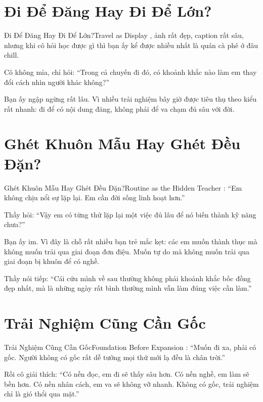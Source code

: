 \section{Đi Để Đăng Hay Đi Để Lớn?}
\begin{truyen}{Đi Để Đăng Hay Đi Để Lớn?}{Travel as Display}
, ảnh rất đẹp, caption rất sâu, nhưng khi cô hỏi học được gì thì bạn ấy kể được nhiều nhất là quán cà phê ở đâu chill.

Cô không mỉa, chỉ hỏi: ``Trong cả chuyến đi đó, có khoảnh khắc nào làm em thay đổi cách nhìn người khác không?''

Bạn ấy ngập ngừng rất lâu. Vì nhiều trải nghiệm bây giờ được tiêu thụ theo kiểu rất nhanh: đi để có nội dung đăng, không phải để va chạm đủ sâu với đời.

\end{truyen}

\section{Ghét Khuôn Mẫu Hay Ghét Đều Đặn?}
\begin{truyen}{Ghét Khuôn Mẫu Hay Ghét Đều Đặn?}{Routine as the Hidden Teacher}
: ``Em không chịu nổi sự lặp lại. Em cần đời sống linh hoạt hơn.''

Thầy hỏi: ``Vậy em có từng thử lặp lại một việc đủ lâu để nó biến thành kỹ năng chưa?''

Bạn ấy im. Vì đây là chỗ rất nhiều bạn trẻ mắc kẹt: các em muốn thành thục mà không muốn trải qua giai đoạn đơn điệu. Muốn tự do mà không muốn trải qua giai đoạn bị khuôn để có nghề.

Thầy nói tiếp: ``Cái cứu mình về sau thường không phải khoảnh khắc bốc đồng đẹp nhất, mà là những ngày rất bình thường mình vẫn làm đúng việc cần làm.''
\end{truyen}

\section{Trải Nghiệm Cũng Cần Gốc}
\begin{truyen}{Trải Nghiệm Cũng Cần Gốc}{Foundation Before Expansion}
: ``Muốn đi xa, phải có gốc. Người không có gốc rất dễ tưởng mọi thứ mới lạ đều là chân trời.''

Rồi cô giải thích: ``Có nền đọc, em đi sẽ thấy sâu hơn. Có nền nghề, em làm sẽ bền hơn. Có nền nhân cách, em va sẽ không vỡ nhanh. Không có gốc, trải nghiệm chỉ là gió thổi qua mặt.''
\end{truyen}

